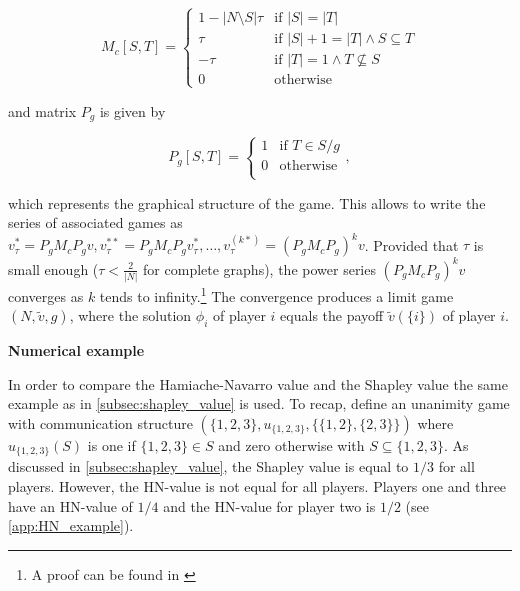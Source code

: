 \begin{equation}
	M_c[S, T] =
	\begin{cases}
		1 - |N \setminus S| \tau & \text{if } |S| = |T|                         \\
		\tau                     & \text{if } |S| + 1 = |T| \land S \subseteq T \\
		-\tau                    & \text{if } |T| = 1  \land T \not \subseteq S \\
		0                        & \text{otherwise}
	\end{cases}
\end{equation}


and matrix $P_g$ is given by

\begin{equation}
	P_g[S, T] =
	\begin{cases}
		1 & \text{if } T \in S/g \\
		0 & \text{otherwise}     \\
	\end{cases}
	,
\end{equation}


which represents the graphical structure of the game. This allows to write the series of associated
games as $v^*_\tau = P_g M_c P_g v, v^{**}_\tau = P_g M_c P_g v^*_\tau, \dots, v^{(k*)}_\tau = \left(P_g M_c P_g\right)^k v$.
Provided that $\tau$ is small enough ($\tau < \frac{2}{|N|}$ for complete graphs\cite{hamiache2001associated}),
the power series $\left(P_g M_c P_g\right)^k v$ converges as $k$ tends to infinity.\footnote{A proof can be found in \cite{hamiache_associated_2020}}
The convergence produces a limit game $(N, \tilde{v}, g)$, where the solution $\phi_i$ of player $i$ equals the
payoff $\tilde{v}(\{i\})$ of player $i$.\cite{zhang2022gstarx, hamiache_associated_2020}


\textbf{Numerical example}

In order to compare the Hamiache-Navarro value and the Shapley value the same example as in \cref{subsec:shapley_value}
is used. To recap, define an unanimity game with communication structure $(\{1, 2, 3\}, u_{\{1, 2, 3\}}, \{\{1, 2\}, \{2, 3\}\})$
where $u_{\{1, 2, 3\}}(S)$ is one if $\{1, 2, 3\} \in S$ and zero otherwise with $S \subseteq \{1, 2, 3\}$. As discussed
in \cref{subsec:shapley_value}, the Shapley value is equal to $1/3$ for all players. However, the HN-value is not equal
for all players. Players one and three have an HN-value of $1/4$ and the HN-value for player two is $1/2$
(see \cref{app:HN_example}).\cite{hamiache_associated_2020}
